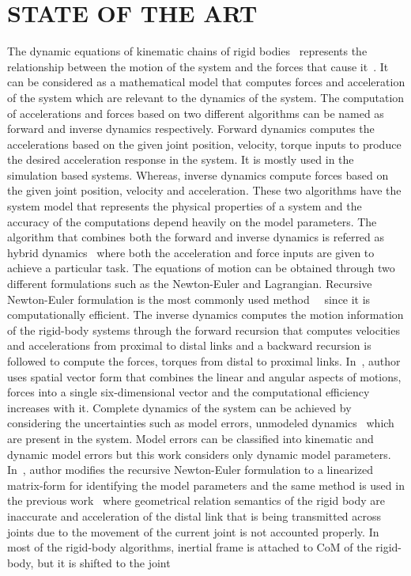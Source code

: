 \chapter{STATE OF THE ART}
\label{sec:stateoftheart}

The dynamic equations of kinematic chains of rigid bodies~\cite{swevers} represents the relationship between the motion of the system and the forces that cause it~\cite{craig2005introduction}. It can be considered as a mathematical model that computes forces and acceleration of the system which are relevant to the dynamics of the system. The computation of accelerations and forces based on two different algorithms can be named as forward and inverse dynamics respectively. Forward dynamics computes the accelerations based on the given joint position, velocity, torque inputs to produce the desired acceleration response in the system. It is mostly used in the simulation based systems. Whereas, inverse dynamics compute forces based on the given joint position, velocity and acceleration. These two algorithms have the system model that represents the physical properties of a system and the accuracy of the computations depend heavily on the model parameters. The algorithm that combines both the forward and inverse dynamics is referred as hybrid dynamics~\cite{featherstone2014rigid} where both the acceleration and force inputs are given to achieve a particular task. The equations of motion can be obtained through two different formulations such as the Newton-Euler and Lagrangian. Recursive Newton-Euler formulation is the most commonly used method~\cite{smits2011kdl}~\cite{featherstone2014rigid} since it is computationally efficient. The inverse dynamics computes the motion information of the rigid-body systems through the forward recursion that computes velocities and accelerations from proximal to distal links and a backward recursion is followed to compute the forces, torques from distal to proximal links. In~\cite{featherstone2014rigid}, author uses spatial vector form that combines the linear and angular aspects of motions, forces into a single six-dimensional vector and the computational efficiency increases with it. Complete dynamics of the system can be achieved by considering the uncertainties such as model errors, unmodeled dynamics~\cite{trajectorytracking_nn} which are present in the system. Model errors can be classified into kinematic and dynamic model errors but this work considers only dynamic model parameters. In~\cite{Atkeson}, author modifies the recursive Newton-Euler formulation to a linearized matrix-form for identifying the model parameters and the same method is used in the previous work~\cite{RnD2Rajagopal} where geometrical relation semantics of the rigid body are inaccurate and acceleration of the distal link that is being transmitted across joints due to the movement of the current joint is not accounted properly. In most of the rigid-body algorithms, inertial frame is attached to CoM of the rigid-body, but it is shifted to the joint 